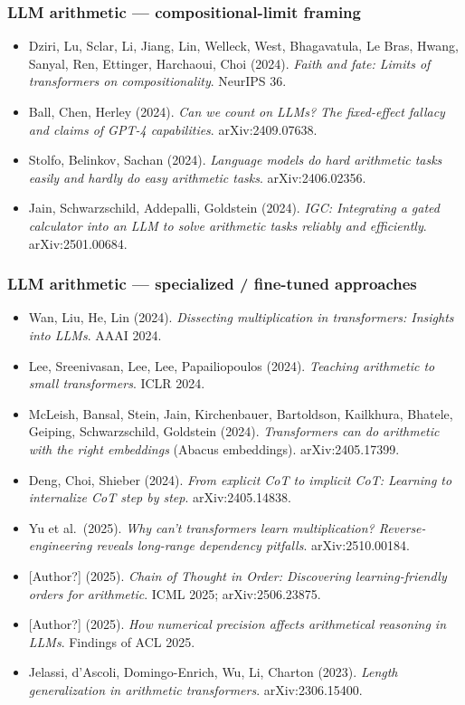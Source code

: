 \documentclass[twocolumn,switch,10pt]{article}
\providecommand{\tightlist}{\setlength{\itemsep}{0pt}\setlength{\parskip}{0pt}}
\begin{document}
\subsubsection{LLM arithmetic --- compositional-limit framing}\label{llm-arithmetic-compositional-limit-framing}

\begin{itemize}
\tightlist
\item
  Dziri, Lu, Sclar, Li, Jiang, Lin, Welleck, West, Bhagavatula, Le
  Bras, Hwang, Sanyal, Ren, Ettinger, Harchaoui, Choi (2024). \emph{Faith
  and fate: Limits of transformers on compositionality}. NeurIPS 36.
\item
  Ball, Chen, Herley (2024). \emph{Can we count on LLMs? The fixed-effect
  fallacy and claims of GPT-4 capabilities}. arXiv:2409.07638.
\item
  Stolfo, Belinkov, Sachan (2024). \emph{Language models do hard arithmetic
  tasks easily and hardly do easy arithmetic tasks}. arXiv:2406.02356.
\item
  Jain, Schwarzschild, Addepalli, Goldstein (2024). \emph{IGC: Integrating
  a gated calculator into an LLM to solve arithmetic tasks reliably
  and efficiently}. arXiv:2501.00684.
\end{itemize}

\subsubsection{LLM arithmetic --- specialized / fine-tuned approaches}\label{llm-arithmetic-specialized-fine-tuned-approaches}

\begin{itemize}
\tightlist
\item
  Wan, Liu, He, Lin (2024). \emph{Dissecting multiplication in
  transformers: Insights into LLMs}. AAAI 2024.
\item
  Lee, Sreenivasan, Lee, Lee, Papailiopoulos (2024). \emph{Teaching
  arithmetic to small transformers}. ICLR 2024.
\item
  McLeish, Bansal, Stein, Jain, Kirchenbauer, Bartoldson, Kailkhura,
  Bhatele, Geiping, Schwarzschild, Goldstein (2024). \emph{Transformers
  can do arithmetic with the right embeddings} (Abacus embeddings).
  arXiv:2405.17399.
\item
  Deng, Choi, Shieber (2024). \emph{From explicit CoT to implicit CoT:
  Learning to internalize CoT step by step}. arXiv:2405.14838.
\item
  Yu et al.~(2025). \emph{Why can't transformers learn multiplication?
  Reverse-engineering reveals long-range dependency pitfalls}.
  arXiv:2510.00184.
\item
  {[}Author?{]} (2025). \emph{Chain of Thought in Order: Discovering
  learning-friendly orders for arithmetic}. ICML 2025;
  arXiv:2506.23875.
\item
  {[}Author?{]} (2025). \emph{How numerical precision affects arithmetical
  reasoning in LLMs}. Findings of ACL 2025.
\item
  Jelassi, d'Ascoli, Domingo-Enrich, Wu, Li, Charton (2023). \emph{Length
  generalization in arithmetic transformers}. arXiv:2306.15400.
\end{itemize}
\end{document}
